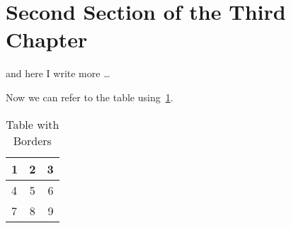 \section{Second Section of the Third Chapter}
and here I write more \dots

Now we can refer to the table using~\cref{t:borders}.
\begin{table}[h]
\caption{Table with Borders}
\centering
\label{t:borders}
\begin{tabular}{|l|c| r|}

\hline
1 & 2 & 3 \\ \hline
4 & 5 & 6 \\ \hline
7 & 8 & 9 \\ \hline
\end{tabular}
\end{table}
